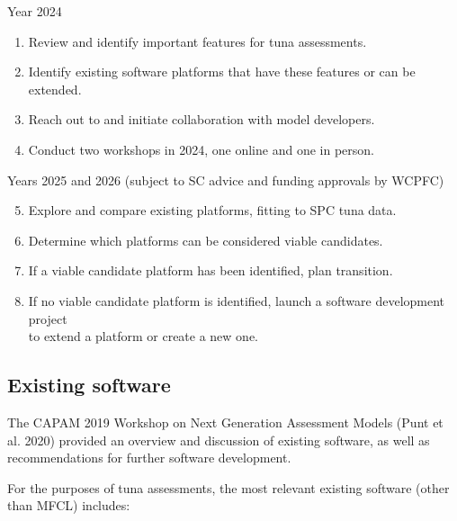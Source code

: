 \documentclass{SCreport}
\begin{document}
Year 2024

\begin{enumerate}
  \item Review and identify important features for tuna assessments.\\[-4.5ex]
  \item Identify existing software platforms that have these features or can be
  extended.\\[-4.5ex]
  \item Reach out to and initiate collaboration with model developers.\\[-4.5ex]
  \item Conduct two workshops in 2024, one online and one in person.\\
\end{enumerate}

Years 2025 and 2026 (subject to SC advice and funding approvals by WCPFC)

\begin{enumerate}\setcounter{enumi}{4}
  \item Explore and compare existing platforms, fitting to SPC tuna
  data.\\[-4.5ex]
  \item Determine which platforms can be considered viable candidates.\\[-4.5ex]
  \item If a viable candidate platform has been identified, plan
  transition.\\[-4.5ex]
  \item If no viable candidate platform is identified, launch a software
  development project\\
  to extend a platform or create a new one.
\end{enumerate}

\subsection{Existing software}

The CAPAM 2019 Workshop on Next Generation Assessment Models (Punt et al. 2020)
provided an overview and discussion of existing software, as well as
recommendations for further software development.

For the purposes of tuna assessments, the most relevant existing software (other
than MFCL) includes:
\end{document}
